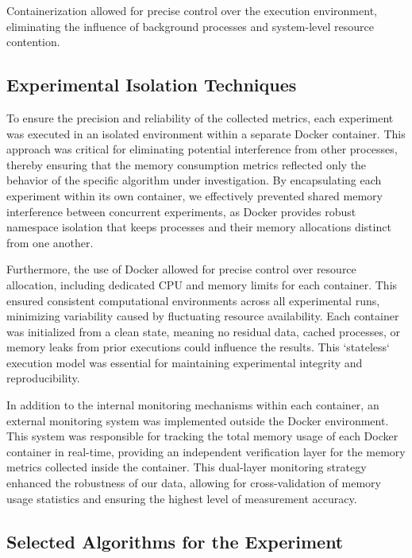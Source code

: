 Containerization allowed for precise control over the execution environment, eliminating the influence of background processes and system-level resource contention.

\subsection{Experimental Isolation Techniques}
\label{subsec:mmc-experimental-isolation-techniques}

To ensure the precision and reliability of the collected metrics, each experiment was executed in an isolated environment within a separate Docker container.
This approach was critical for eliminating potential interference from other processes, thereby ensuring that the memory consumption metrics reflected only the behavior of the specific algorithm under investigation.
By encapsulating each experiment within its own container, we effectively prevented shared memory interference between concurrent experiments, as Docker provides robust namespace isolation that keeps processes and their memory allocations distinct from one another.

Furthermore, the use of Docker allowed for precise control over resource allocation, including dedicated \ac{CPU} and memory limits for each container.
This ensured consistent computational environments across all experimental runs, minimizing variability caused by fluctuating resource availability.
Each container was initialized from a clean state, meaning no residual data, cached processes, or memory leaks from prior executions could influence the results.
This `stateless` execution model was essential for maintaining experimental integrity and reproducibility.

In addition to the internal monitoring mechanisms within each container, an external monitoring system was implemented outside the Docker environment.
This system was responsible for tracking the total memory usage of each Docker container in real-time, providing an independent verification layer for the memory metrics collected inside the container.
This dual-layer monitoring strategy enhanced the robustness of our data, allowing for cross-validation of memory usage statistics and ensuring the highest level of measurement accuracy.

\subsection{Selected Algorithms for the Experiment}
\label{subsec:mmc-selected-algorithms-for-the-experiment}

